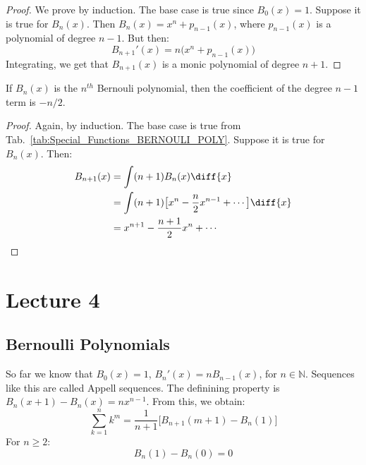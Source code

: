 \documentclass[crop=false,class=book,oneside]{standalone}
\begin{document}
            \begin{proof}
                We prove by induction. The base case is true since
                $B_{0}(x)=1$. Suppose it is true for $B_{n}(x)$.
                Then $B_{n}(x)=x^{n}+p_{n-1}(x)$, where
                $p_{n-1}(x)$ is a polynomial of degree $n-1$.
                But then:
                \begin{equation}
                    B_{n+1}'(x)=n\big(x^{n}+p_{n-1}(x)\big)
                \end{equation}
                Integrating, we get that $B_{n+1}(x)$ is a monic
                polynomial of degree $n+1$.
            \end{proof}
            \begin{theorem}
                If $B_{n}(x)$ is the $n^{th}$ Bernouli polynomial,
                then the coefficient of the degree $n-1$ term is
                $-n/2$.
            \end{theorem}
            \begin{proof}
                Again, by induction. The base case is true from
                Tab.~\ref{tab:Special_Functions_BERNOULI_POLY}.
                Suppose it is true for $B_{n}(x)$. Then:
                \begin{align*}
                    B_{n+1}(x)&=
                    \int(n+1)B_{n}(x)\diff{x}\\
                    &=\int(n+1)
                    \big[x^{n}-\frac{n}{2}x^{n-1}+\cdots\big]
                    \diff{x}\\
                    &=x^{n+1}-\frac{n+1}{2}x^{n}+\cdots
                \end{align*}
            \end{proof}
    \section{Lecture 4}
        \subsection{Bernoulli Polynomials}
            So far we know that $B_{0}(x)=1$, 
            $B_{n}'(x)=nB_{n-1}(x)$, for $n\in\mathbb{N}$.
            Sequences like this are called Appell sequences.
            The definining property is
            $B_{n}(x+1)-B_{n}(x)=nx^{n-1}$. From this, we obtain:
            \begin{equation}
                \sum_{k=1}^{n}k^{m}=
                \frac{1}{n+1}\Big[B_{n+1}(m+1)-B_{n}(1)\Big]
            \end{equation}
            For $n\geq{2}$:
            \begin{equation}
                B_{n}(1)-B_{n}(0)=0
            \end{equation}
\end{document}
